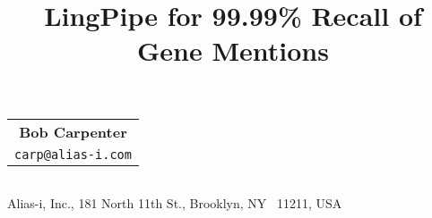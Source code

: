 \documentclass[twoside,11pt]{article}
\author{}
\date{}
\title{\bf
LingPipe for 99.99\% Recall of Gene Mentions
}
\begin{document}
\maketitle
\thispagestyle{myheadings}
\vspace{-1.8cm}

\begin{center}
\begin{tabular}[t]{c}                      %
  \bf    Bob Carpenter
\\
  \small\tt carp@alias-i.com
\end{tabular}
\smallskip

\begin{tabular}[t]{c}                        %
\end{tabular}
\smallskip



\begin{small}
Alias-i, Inc., 181 North 11th St., Brooklyn, NY \ 11211, USA
\end{small}
\bigskip
\end{center}
\end{document}
